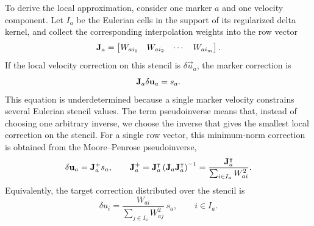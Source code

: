 To derive the local approximation, consider one marker \(a\) and one velocity
component. Let \(I_a\) be the Eulerian cells in the support of its regularized
delta kernel, and collect the corresponding interpolation weights into the row
vector
\begin{equation}
    \mathbf{J}_a =
    \begin{bmatrix}
        W_{ai_1} & W_{ai_2} & \cdots & W_{ai_m}
    \end{bmatrix}.
    \label{eq:mdf-local-row}
\end{equation}
If the local velocity correction on this stencil is
\(\delta\vec u_a\), the marker correction is
\begin{equation}
    \mathbf{J}_a\delta\mathbf{u}_a = s_a .
    \label{eq:mdf-local-constraint}
\end{equation}
This equation is underdetermined because a single marker velocity constrains
several Eulerian stencil values. The term pseudoinverse means that, instead of
choosing one arbitrary inverse, we choose the inverse that gives the smallest
local correction on the stencil. For a single row vector, this
minimum-norm correction is obtained from the Moore--Penrose pseudoinverse,
\begin{equation}
    \delta\mathbf{u}_a
    = \mathbf{J}_a^+ s_a,
    \qquad
    \mathbf{J}_a^+
    = \mathbf{J}_a^\intercal
    \left(\mathbf{J}_a\mathbf{J}_a^\intercal\right)^{-1}
    = \frac{\mathbf{J}_a^\intercal}{\sum_{i\in I_a}W_{ai}^2}.
    \label{eq:mdf-pseudoinverse}
\end{equation}
Equivalently, the target correction distributed over the stencil is
\begin{equation}
    \delta u_i
    = \frac{W_{ai}}{\sum_{j\in I_a}W_{aj}^2}\,s_a,
    \qquad i\in I_a .
    \label{eq:mdf-local-minimum-norm-update}
\end{equation}

